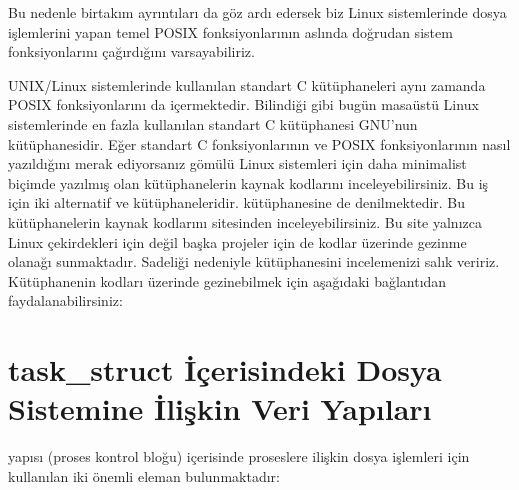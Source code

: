 \documentclass[a4paper,10pt,turkish]{sphinxmanual}
\begin{document}
\sphinxAtStartPar
Bu nedenle birtakım ayrıntıları da göz ardı edersek biz Linux sistemlerinde dosya işlemlerini
yapan temel POSIX fonksiyonlarının aslında doğrudan  sistem fonksiyonlarını çağırdığını
varsayabiliriz.

\sphinxAtStartPar
UNIX/Linux sistemlerinde kullanılan standart C kütüphaneleri aynı zamanda POSIX fonksiyonlarını
da içermektedir. Bilindiği gibi bugün masaüstü Linux sistemlerinde en fazla kullanılan standart C
kütüphanesi GNU’nun  kütüphanesidir. Eğer standart C fonksiyonlarının ve POSIX
fonksiyonlarının nasıl yazıldığını merak ediyorsanız gömülü Linux sistemleri için daha minimalist
biçimde yazılmış olan kütüphanelerin kaynak kodlarını inceleyebilirsiniz. Bu iş için iki alternatif
 ve  kütüphaneleridir.  kütüphanesine  de denilmektedir.
Bu kütüphanelerin kaynak kodlarını  sitesinden
inceleyebilirsiniz. Bu site yalnızca Linux çekirdekleri için değil başka projeler için de kodlar
üzerinde gezinme olanağı sunmaktadır. Sadeliği nedeniyle  kütüphanesini incelemenizi salık
veririz. Kütüphanenin kodları üzerinde gezinebilmek için aşağıdaki bağlantıdan
faydalanabilirsiniz:

\sphinxAtStartPar
{}


\section{task\_struct İçerisindeki Dosya Sistemine İlişkin Veri Yapıları}
\label{\detokenize{filesystem1:task-struct-icerisindeki-dosya-sistemine-iliskin-veri-yapilari}}
\sphinxAtStartPar
{} yapısı (proses kontrol bloğu) içerisinde proseslere ilişkin dosya işlemleri için
kullanılan iki önemli eleman bulunmaktadır:

\begin{sphinxVerbatim}[commandchars=\\\{\}]



\end{sphinxVerbatim}
\end{document}
